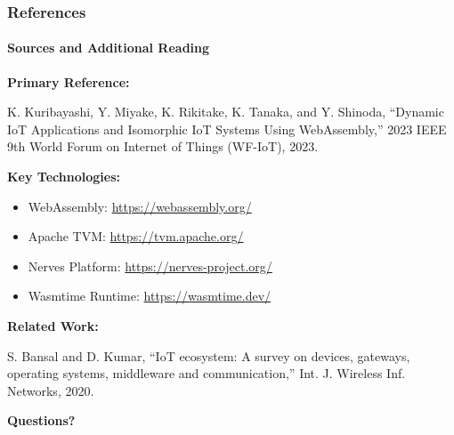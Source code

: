 \documentclass{beamer}
\begin{document}
\begin{frame}
\frametitle{References}
\framesubtitle{Sources and Additional Reading}

\textbf{Primary Reference:}
\begin{small}
K. Kuribayashi, Y. Miyake, K. Rikitake, K. Tanaka, and Y. Shinoda, ``Dynamic IoT Applications and Isomorphic IoT Systems Using WebAssembly,'' 2023 IEEE 9th World Forum on Internet of Things (WF-IoT), 2023.
\end{small}

\textbf{Key Technologies:}
\begin{itemize}
\item WebAssembly: \url{https://webassembly.org/}
\item Apache TVM: \url{https://tvm.apache.org/}
\item Nerves Platform: \url{https://nerves-project.org/}
\item Wasmtime Runtime: \url{https://wasmtime.dev/}
\end{itemize}

\textbf{Related Work:}
\begin{small}
S. Bansal and D. Kumar, ``IoT ecosystem: A survey on devices, gateways, operating systems, middleware and communication,'' Int. J. Wireless Inf. Networks, 2020.
\end{small}

\textbf{Questions?}
\end{frame}
\end{document}
